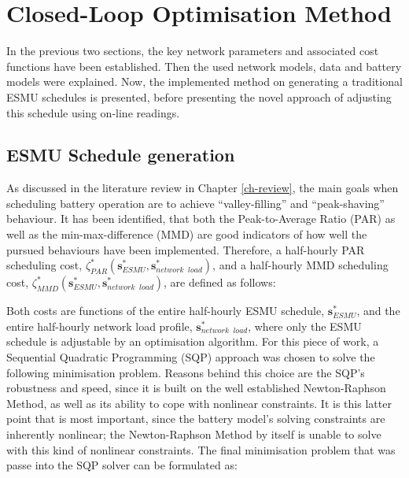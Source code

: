 \section{Closed-Loop Optimisation Method}
\label{ch1:sec:closed-loop-optimisation-method}

In the previous two sections, the key network parameters and associated cost functions have been established.
Then the used network models, data and battery models were explained.
Now, the implemented method on generating a traditional ESMU schedules is presented, before presenting the novel approach of adjusting this schedule using on-line readings.

\subsection{ESMU Schedule generation}
\label{ch1:subsec:esmu-schedule-generation}

As discussed in the literature review in Chapter \ref{ch-review}, the main goals when scheduling battery operation are to achieve ``valley-filling'' and ``peak-shaving'' behaviour.
It has been identified, that both the Peak-to-Average Ratio (PAR) as well as the min-max-difference (MMD) are good indicators of how well the pursued behaviours have been implemented.
Therefore, a half-hourly PAR scheduling cost, $\zeta^*_{PAR}(\textbf{s}^*_{ESMU}, \textbf{s}^*_{network\;\;load})$, and a half-hourly MMD scheduling cost, $\zeta^*_{MMD}(\textbf{s}^*_{ESMU}, \textbf{s}^*_{network\;\;load})$, are defined as follows:





Both costs are functions of the entire half-hourly ESMU schedule, $\textbf{s}^*_{ESMU}$, and the entire half-hourly network load profile, $\textbf{s}^*_{network\;\;load}$, where only the ESMU schedule is adjustable by an optimisation algorithm.
For this piece of work, a Sequential Quadratic Programming (SQP) approach was chosen to solve the following minimisation problem.
Reasons behind this choice are the SQP's robustness and speed, since it is built on the well established Newton-Raphson Method, as well as its ability to cope with nonlinear constraints.
It is this latter point that is most important, since the battery model's solving constraints are inherently nonlinear; the Newton-Raphson Method by itself is unable to solve with this kind of nonlinear constraints.
The final minimisation problem that was passe into the SQP solver can be formulated as:

